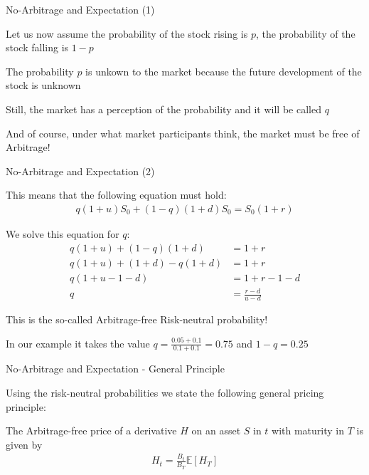 


{No-Arbitrage and Expectation (1)}






	Let us now assume the probability of the stock rising is $p$, the probability of the stock falling is $1-p$


	The probability $p$ is unkown to the market because the future development of the stock is unknown
  \vspace{0.3cm}


	Still, the market has a perception of the probability and it will  be called $q$


	And of course, under what market participants think, the market must be free of Arbitrage!





{No-Arbitrage and Expectation (2)}






	This means that the following equation must hold:
  \begin{align*}
    q (1+u) S_0 + (1-q) (1+d) S_0 = S_0 (1+r)
  \end{align*}


	We solve this equation for $q$:
  \begin{align*}
    q (1+u) + (1-q) (1+d) & = 1+r \\
    q (1+u) + (1+d) -q (1+d) & = 1+r \\
    q (1+u - 1 -d) & = 1+r -1 - d\\
    q & = \frac{r-d}{u-d}
  \end{align*}


	This is the so-called Arbitrage-free Risk-neutral probability!


	In our example it takes the value $q = \frac{0.05 + 0.1}{0.1 + 0.1} = 0.75$ and $1-q=0.25$





{No-Arbitrage and Expectation - General Principle}






	Using the risk-neutral probabilities we state the following general pricing principle:


	The Arbitrage-free price of a derivative $H$ on an asset $S$ in $t$ with maturity in $T$ is given by
  \begin{align*}
    H_t = \frac{B_t}{B_T} \mathbb{E}[H_T]
  \end{align*}


